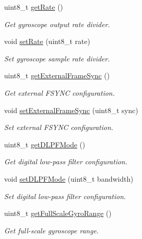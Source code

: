 \begin{DoxyCompactItemize}
uint8\+\_\+t \mbox{\hyperlink{classMPU6050_a887a173e079980505763ffd1aa9fec05}{get\+Rate}} ()
\begin{DoxyCompactList}\small\item\em Get gyroscope output rate divider. \end{DoxyCompactList}\item 
void \mbox{\hyperlink{classMPU6050_a7d03801d6b656e8e12cd3c1dd97824a8}{set\+Rate}} (uint8\+\_\+t rate)
\begin{DoxyCompactList}\small\item\em Set gyroscope sample rate divider. \end{DoxyCompactList}\item 
uint8\+\_\+t \mbox{\hyperlink{classMPU6050_a902a7d486cd6ac21f8c378634dc6f59a}{get\+External\+Frame\+Sync}} ()
\begin{DoxyCompactList}\small\item\em Get external F\+S\+Y\+NC configuration. \end{DoxyCompactList}\item 
void \mbox{\hyperlink{classMPU6050_a77b36f41c531a11b5a835fc75a9aefe6}{set\+External\+Frame\+Sync}} (uint8\+\_\+t sync)
\begin{DoxyCompactList}\small\item\em Set external F\+S\+Y\+NC configuration. \end{DoxyCompactList}\item 
uint8\+\_\+t \mbox{\hyperlink{classMPU6050_a9f2737fe22955fd85b2575ba8da874c6}{get\+D\+L\+P\+F\+Mode}} ()
\begin{DoxyCompactList}\small\item\em Get digital low-\/pass filter configuration. \end{DoxyCompactList}\item 
void \mbox{\hyperlink{classMPU6050_a7a782ade8af2f88dfef7171487f59a3b}{set\+D\+L\+P\+F\+Mode}} (uint8\+\_\+t bandwidth)
\begin{DoxyCompactList}\small\item\em Set digital low-\/pass filter configuration. \end{DoxyCompactList}\item 
uint8\+\_\+t \mbox{\hyperlink{classMPU6050_acb1fa088d43d76230106a3226f343013}{get\+Full\+Scale\+Gyro\+Range}} ()
\begin{DoxyCompactList}\small\item\em Get full-\/scale gyroscope range. \end{DoxyCompactList}\item 

\end{DoxyCompactItemize}
